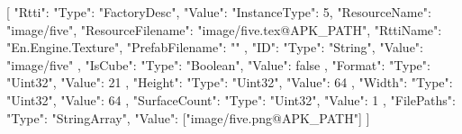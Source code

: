 [{
        "Rtti": {
            "Type": "FactoryDesc",
            "Value": {
                "InstanceType": 5,
                "ResourceName": "image/five",
                "ResourceFilename": "image/five.tex@APK_PATH",
                "RttiName": "En.Engine.Texture",
                "PrefabFilename": ""
            }
        },
        "ID": {
            "Type": "String",
            "Value": "image/five"
        },
        "IsCube": {
            "Type": "Boolean",
            "Value": false
        },
        "Format": {
            "Type": "Uint32",
            "Value": 21
        },
        "Height": {
            "Type": "Uint32",
            "Value": 64
        },
        "Width": {
            "Type": "Uint32",
            "Value": 64
        },
        "SurfaceCount": {
            "Type": "Uint32",
            "Value": 1
        },
        "FilePaths": {
            "Type": "StringArray",
            "Value": ["image/five.png@APK_PATH"]
        }
    }]